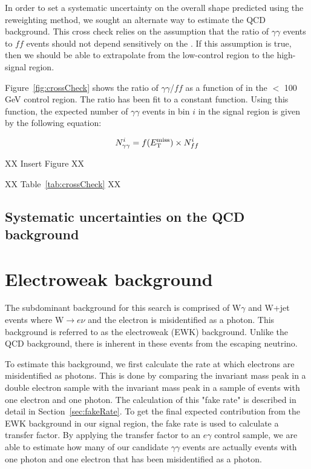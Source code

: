 In order to set a systematic uncertainty on the overall \ETmiss shape predicted using the \diempt reweighting method, we sought an alternate way to estimate the QCD background. This cross check relies on the assumption that the ratio of $\gamma\gamma$ events to $ff$ events should not depend sensitively on the \ETmiss. If this assumption is true, then we should be able to extrapolate from the low-\ETmiss control region to the high-\ETmiss signal region.

Figure~\ref{fig:crossCheck} shows the ratio of $\gamma\gamma$/$ff$ as a function of \ETmiss in the \ETmiss $<$ 100 GeV control region. The ratio has been fit to a constant function. Using this function, the expected number of $\gamma\gamma$ events in bin $i$ in the signal region is given by the following equation:

\begin{equation}
N_{\gamma\gamma}^i = f(E_{\mathrm{T}}^{\text{miss}}) \times N_{ff}^i 
\end{equation}

XX Insert Figure XX

XX Table~\ref{tab:crossCheck} XX 



\subsection{Systematic uncertainties on the QCD background}
\label{sec:QCDSysUncert}




\section{Electroweak background}
\label{sec:EWK}

The subdominant background for this search is comprised of W$\gamma$ and W+jet events where W$\rightarrow e \nu$ and the electron is misidentified as a photon. This background is referred to as the electroweak (EWK) background. Unlike the QCD background, there is inherent \ETmiss in these events from the escaping neutrino. 

To estimate this background, we first calculate the rate at which electrons are misidentified as photons. This is done by comparing the invariant mass peak in a double electron sample with the invariant mass peak in a sample of events with one electron and one photon. The calculation of this "fake rate" is described in detail in Section~\ref{sec:fakeRate}. To get the final expected contribution from the EWK background in our signal region, the fake rate is used to calculate a transfer factor. By applying the transfer factor to an $e\gamma$ control sample, we are able to estimate how many of our candidate $\gamma\gamma$ events are actually events with one photon and one electron that has been misidentified as a photon. 

